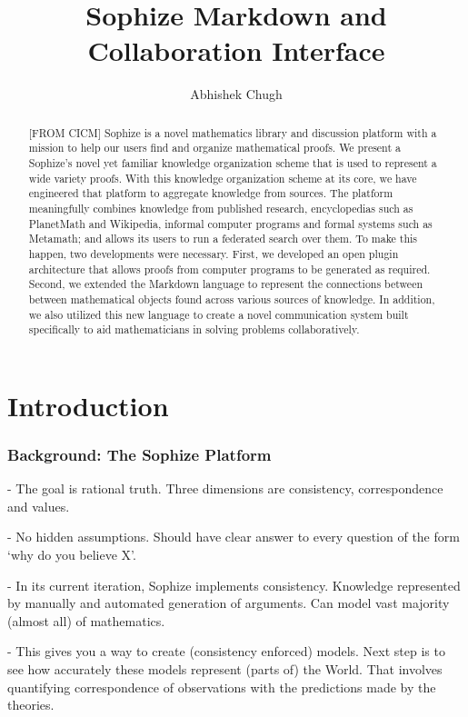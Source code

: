 \documentclass[a4paper]{article}
\title{Sophize Markdown and Collaboration Interface }
\author{ Abhishek Chugh }
\begin{document}
\maketitle

\begin{abstract}
[FROM CICM] Sophize is a novel mathematics library and discussion platform with a mission to help our users find and organize mathematical proofs. We present a Sophize's novel yet familiar knowledge organization scheme that is used to represent a wide variety proofs. With this knowledge organization scheme at its core, we have engineered that platform to aggregate knowledge from sources. The platform meaningfully combines knowledge from published research, encyclopedias such as PlanetMath and Wikipedia, informal computer programs and formal systems such as Metamath; and allows its users to run a federated search over them. To make this happen, two developments were necessary. First, we developed an open plugin architecture that allows proofs from computer programs to be generated as required. Second, we extended the Markdown language to represent the connections between between mathematical objects found across various sources of knowledge. In addition, we also utilized this new language to create a novel communication system built specifically to aid mathematicians in solving problems collaboratively.

\end{abstract}

\vskip 32pt

\section{Introduction}

\subsubsection*{Background: The Sophize Platform}

- The goal is rational truth. Three dimensions are consistency, correspondence and values.

- No hidden assumptions. Should have clear answer to every question of the form `why do you believe X'.

- In its current iteration, Sophize implements consistency. Knowledge represented by manually and automated generation of arguments. Can model vast majority (almost all) of mathematics.

- This gives you a way to create (consistency enforced) models. Next step is to see how accurately these models represent (parts of) the World. That involves quantifying correspondence of observations with the predictions made by the theories.
\end{document}
